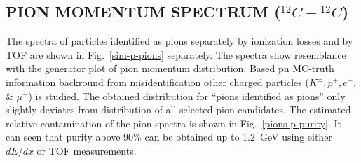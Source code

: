 \documentclass[12pt]{article}
\begin{document}


\subsection{PION MOMENTUM SPECTRUM ($^{12}C-{^{12}C}$)}
The spectra of particles identified as pions separately by ionization losses
and by TOF are shown in Fig.~\ref{sim-p-pions} separately.
The spectra show resemblance with the generator plot of pion momentum distribution.
Based pn MC-truth information backround from misidentification other charged particles
($K^{\pm}, p^{\pm}, e^{\pm},$ \& $\mu^{\pm}$) is studied. The obtained distribution
for ``pions identified as pions'' only slightly deviates from distribution of all
selected pion candidates. The estimated relative contamination of the pion spectra is
shown in Fig.~\ref{pions-p-purity}. It can seen that purity above 90\% can be obtained
up to 1.2~GeV using either $dE/dx$ or TOF measurements.
\end{document}
